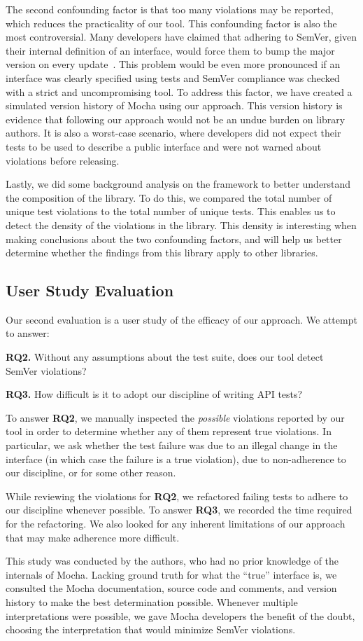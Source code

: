 The second confounding factor is that too many violations may be
reported, which reduces the practicality of our tool. This
confounding factor is also the most controversial. Many developers
have claimed that adhering to SemVer, given their internal definition
of an interface, would force them to bump the major version on every
update~\cite{backbone-2888,exoplayer-1382,crawford-not-semver}. This
problem would be even more pronounced if an interface was clearly
specified using tests and SemVer compliance was checked with a strict
and uncompromising tool. To address this factor, we have created a
simulated version history of Mocha using our approach. This version
history is evidence that following our approach would not be an undue
burden on library authors. It is also a worst-case scenario, where
developers did not expect their tests to be used to describe a public
interface and were not warned about violations before releasing.

 \-Lastly, we did some background analysis on the framework to better
understand the composition of the library. To do this, we compared the
total number of unique test violations to the total number of unique
tests. This enables us to detect the density of the violations in the
library. This density is interesting when making conclusions about
the two confounding factors, and will help us better determine
whether the findings from this library apply to other libraries.

\subsection{User Study Evaluation}
Our second evaluation is a user study of the efficacy of our
approach. We attempt to answer: 

{\bf RQ2.} Without any assumptions about the test suite, does our tool
detect SemVer violations?

{\bf RQ3.} How difficult is it to adopt our discipline of writing API
tests?

To answer {\bf RQ2}, we manually inspected the {\em possible} 
violations reported by our tool in order to determine whether any of
them represent true violations. In particular, we ask whether the test
failure was due to an illegal change in the interface (in which case
the failure is a true violation), due to non-adherence to our
discipline, or for some other reason.

While reviewing the violations for {\bf RQ2}, we refactored failing
tests to adhere to our discipline whenever possible. To answer {\bf
  RQ3}, we recorded the time required for the refactoring. We also
looked for any inherent limitations of our approach that may make
adherence more difficult.

This study was conducted by the authors, who had no prior knowledge of
the internals of Mocha. Lacking ground truth for what the ``true''
interface is, we consulted the Mocha documentation, source code and
comments, and version history to make the best determination
possible. Whenever multiple interpretations were possible, we gave
Mocha developers the benefit of the doubt, choosing the interpretation
that would minimize SemVer violations.

